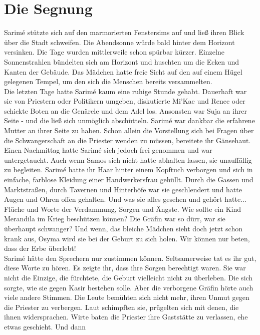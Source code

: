 \chapter{Die Segnung}

Sarimé stützte sich auf den marmorierten Fenstersims auf und ließ ihren Blick über die Stadt 
schweifen. Die Abendsonne würde bald hinter dem Horizont versinken. Die Tage wurden mittlerweile 
schon spürbar kürzer. Einzelne Sonnenstrahlen bündelten sich am Horizont und huschten um die Ecken 
und Kanten der Gebäude. Das Mädchen hatte freie Sicht auf den auf einem Hügel gelegenen Tempel, 
um den sich die Menschen bereits versammelten.\\
Die letzten Tage hatte Sarimé kaum eine ruhige Stunde gehabt. Dauerhaft war sie von Priestern oder 
Politikern umgeben, diskutierte Mi'Kae und Renec oder schickte Boten an die Genärele und dem Adel 
los. Ansonsten war Suja an ihrer Seite - und die ließ sich unmöglich abschütteln. Sarimé war dankbar 
die erfahrene Mutter an ihrer Seite zu haben. Schon allein die Vorstellung sich bei Fragen über die 
Schwangerschaft an die Priester wenden zu müssen, bereitete ihr Gänsehaut.\\
Einen Nachmittag hatte Sarimé sich jedoch frei genommen und war untergetaucht. Auch wenn Samos sich 
nicht hatte abhalten lassen, sie unauffällig zu begleiten. Sarimé hatte ihr Haar hinter einem 
Kopftuch verborgen und sich in einfache, farblose Kleidung einer Handwerkersfrau gehüllt. Durch die 
Gassen und Marktstraßen, durch Tavernen und Hinterhöfe war sie geschlendert und hatte Augen und 
Ohren offen gehalten. Und was sie alles gesehen und gehört hatte...\\
Flüche und Worte der Verdammung, Sorgen und Ängste. Wie sollte ein Kind Merandila im Krieg 
beschützen können? Die Gräfin war so dürr, war sie überhaupt schwanger? Und wenn, das bleiche 
Mädchen sieht doch jetzt schon krank aus, Osyma wird sie bei der Geburt zu sich holen. Wir können 
nur beten, dass der Erbe überlebt!\\
Sarimé hätte den Sprechern nur zustimmen können. Seltsamerweise tat es ihr gut, diese Worte zu 
hören. Es zeigte ihr, dass ihre Sorgen berechtigt waren. Sie war nicht die Einzige, die fürchtete, 
die Geburt vielleicht nicht zu überleben. Die sich sorgte, wie sie gegen Kasir bestehen solle. Aber 
die verborgene Gräfin hörte auch viele andere Stimmen. Die Leute bemühten sich nicht mehr, ihren 
Unmut gegen die Priester zu verbergen. Laut schimpften sie, prügelten sich mit denen, die ihnen 
widersprachen. Wirte baten die Priester ihre Gaststätte zu verlassen, ehe etwas geschieht. Und dann 
